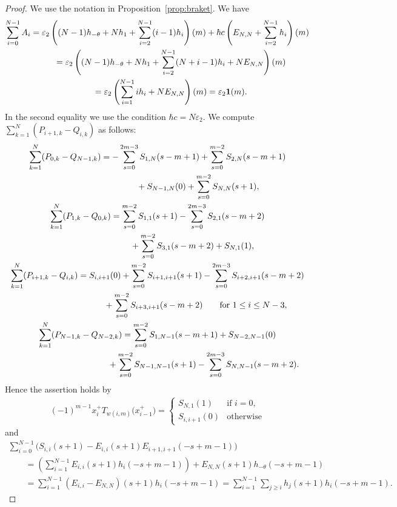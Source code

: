 \documentclass[11pt]{article}
\theoremstyle{definition}
\numberwithin{equation}{section}
\newcommand{\ve}{\varepsilon}
\newcommand{\bfid}{\mathbf{1}}
\begin{document}
\begin{proof} We use the notation in Proposition~\ref{prop:braket}. We have
\begin{gather*}
\sum_{i=0}^{N-1} A_i = \ve_2 \left((N-1)h_{-\theta} + N h_1 + \sum_{i=2}^{N-1}(i-1)h_i\right)(m) + \hbar c \left(E_{N,N}+\sum_{i=2}^{N-1} h_i\right)(m) \\
\hphantom{\sum_{i=0}^{N-1} A_i}{} = \ve_2 \left( (N-1)h_{-\theta} + Nh_1 + \sum_{i=2}^{N-1} (N+i-1) h_i + NE_{N,N} \right)(m) \\
\hphantom{\sum_{i=0}^{N-1} A_i}{} = \ve_2 \left( \sum_{i=1}^{N-1} i h_i + NE_{N,N}\right)(m)=\ve_2 \bfid(m).
\end{gather*}
In the second equality we use the condition $\hbar c = N\ve_2$. We compute $\sum\limits_{k=1}^{N} (P_{i+1,k}-Q_{i,k})$ as follows:
\begin{gather*}
\sum_{k=1}^{N} (P_{0,k}-Q_{N-1,k}) = - \sum_{s=0}^{2m-3}S_{1,N}(s-m+1) + \sum_{s=0}^{m-2}S_{2,N}(s-m+1)\\
\hphantom{\sum_{k=1}^{N} (P_{0,k}-Q_{N-1,k})=}{} +S_{N-1,N}(0)+\sum_{s=0}^{m-2} S_{N,N}(s+1),
\\
\sum_{k=1}^{N} (P_{1,k}-Q_{0,k}) = \sum_{s=0}^{m-2} S_{1,1}(s+1) - \sum_{s=0}^{2m-3}S_{2,1}(s-m+2) \\
\hphantom{\sum_{k=1}^{N} (P_{1,k}-Q_{0,k}) =}{} + \sum_{s=0}^{m-2}S_{3,1}(s-m+2)+S_{N,1}(1),
\\
\sum_{k=1}^{N} (P_{i+1,k}-Q_{i,k}) = S_{i,i+1}(0) + \sum_{s=0}^{m-2} S_{i+1,i+1}(s+1)- \sum_{s=0}^{2m-3}S_{i+2,i+1}(s-m+2) \\
\hphantom{\sum_{k=1}^{N} (P_{i+1,k}-Q_{i,k}) =}{} + \sum_{s=0}^{m-2}S_{i+3,i+1}(s-m+2) \qquad \text{for}\ 1 \leq i \leq N-3,
\\
\sum_{k=1}^{N} (P_{N-1,k}-Q_{N-2,k})= \sum_{s=0}^{m-2}S_{1,N-1}(s-m+1)+S_{N-2,N-1}(0)\\
\hphantom{\sum_{k=1}^{N} (P_{N-1,k}-Q_{N-2,k})=}{} +\sum_{s=0}^{m-2} S_{N-1,N-1}(s+1) - \sum_{s=0}^{2m-3}S_{N,N-1}(s-m+2).
\end{gather*}
Hence the assertion holds by
\begin{gather*}
(-1)^{m-1} x_i^+ T_{w(i,m)}\big(x_{i-1}^+\big) = \begin{cases}
S_{N,1}(1) & \text{if $i=0$,}\\
S_{i,i+1}(0) & \text{otherwise}
\end{cases}
\end{gather*}
and
\begin{gather*}
\sum_{i=0}^{N-1} \big( S_{i,i}(s+1) - E_{i,i}(s+1) E_{i+1,i+1}(-s+m-1) \big) \\
\qquad{}= \left( \sum_{i=1}^{N-1} E_{i,i}(s+1) h_{i}(-s+m-1) \right)+ E_{N,N}(s+1)h_{-\theta}(-s+m-1)\\
\qquad{} = \sum_{i=1}^{N-1} (E_{i,i}-E_{N,N})(s+1) h_{i}(-s+m-1) = \sum_{i=1}^{N-1} \sum_{j \geq i} h_j(s+1) h_i(-s+m-1).\tag*{\qed}
\end{gather*}\renewcommand{\qed}{}
\end{proof}
\end{document}
